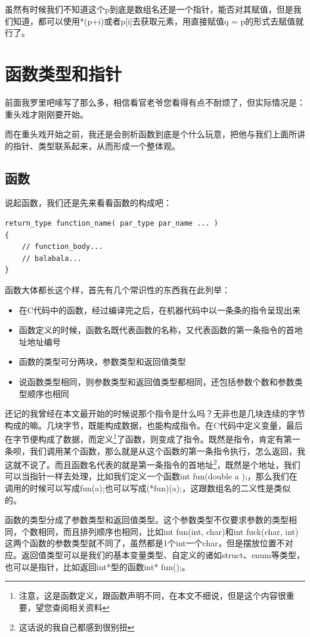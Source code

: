 \documentclass[11pt,twoside,a4paper,titlepage]{article}	%
\begin{document}
虽然有时候我们不知道这个p到底是数组名还是一个指针，能否对其赋值，但是我们知道，都可以使用*(p+i)或者p[i]去获取元素，用直接赋值q = p的形式去赋值就行了。

\newpage
\section{函数类型和指针}
前面我罗里吧嗦写了那么多，相信看官老爷您看得有点不耐烦了，但实际情况是：重头戏才刚刚要开始。

而在重头戏开始之前，我还是会剖析函数到底是个什么玩意，把他与我们上面所讲的指针、类型联系起来，从而形成一个整体观。

\subsection{函数}
说起函数，我们还是先来看看函数的构成吧：

\begin{lstlisting}
return_type function_name( par_type par_name ... )
{
	// function_body...
	// balabala...
}
\end{lstlisting}

函数大体都长这个样，首先有几个常识性的东西我在此列举：

\begin{itemize}
	\item 在C代码中的函数，经过编译完之后，在机器代码中以一条条的指令呈现出来
	\item 函数定义的时候，函数名既代表函数的名称，又代表函数的第一条指令的首地址地址编号
	\item 函数的类型可分两块，参数类型和返回值类型
	\item 说函数类型相同，则参数类型和返回值类型都相同，还包括参数个数和参数类型顺序也相同
\end{itemize}

还记的我曾经在本文最开始的时候说那个指令是什么吗？无非也是几块连续的字节构成的嘛。几块字节，既能构成数据，也能构成指令。在C代码中定义变量，最后在字节便构成了数据，而定义\footnote{注意，这是函数定义，跟函数声明不同，在本文不细说，但是这个内容很重要，望您查阅相关资料}了函数，则变成了指令。既然是指令，肯定有第一条呗，我们调用某个函数，那么就是从这个函数的第一条指令执行，怎么返回，我这就不说了。而且函数名代表的就是第一条指令的首地址\footnote{这话说的我自己都感到很别扭}，既然是个地址，我们可以当指针一样去处理，比如我们定义一个函数int fun(double a );，那么我们在调用的时候可以写成fun(a);也可以写成(*fun)(a);，这跟数组名的二义性是类似的。

函数的类型分成了参数类型和返回值类型。这个参数类型不仅要求参数的类型相同，个数相同，而且排列顺序也相同，比如int fun(int, char)和int fuck(char, int)这两个函数的参数类型就不同了，虽然都是1个int一个char，但是摆放位置不对应。返回值类型可以是我们的基本变量类型、自定义的诸如struct、enum等类型，也可以是指针，比如返回int*型的函数int* fun();。
\end{document}
